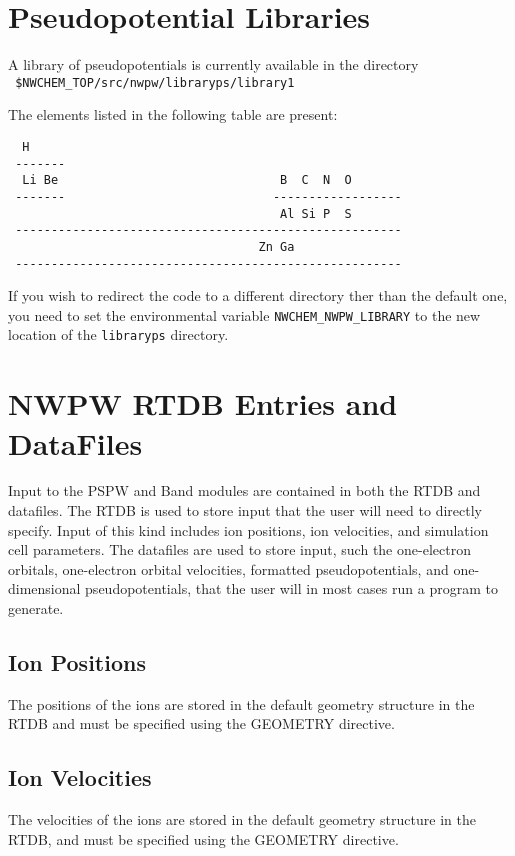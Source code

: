 \section{Pseudopotential Libraries}
\label{sec:psp_library}

A library of pseudopotentials is currently available  in the
directory \\
\verb+ $NWCHEM_TOP/src/nwpw/libraryps/library1+

The elements listed in the following table are present:

\begin{verbatim}
  H
 -------
  Li Be                               B  C  N  O
 -------                             ------------------
                                      Al Si P  S     
 ------------------------------------------------------
                                   Zn Ga               
 ------------------------------------------------------
\end{verbatim}

If you wish to redirect the code to a different directory ther than
the default one, 
you need to set the environmental variable
{\tt NWCHEM\_NWPW\_LIBRARY}
to the new location of the \verb+libraryps+ directory.



\section{NWPW RTDB Entries and DataFiles}
\label{sec:pspw_data}
Input to the PSPW and Band modules are contained in both the RTDB and datafiles.
The RTDB is used to store input that the user will need to directly specify.
Input of this kind includes ion positions, ion velocities, and simulation cell
parameters.  The datafiles are used to store input, such the one-electron 
orbitals, one-electron orbital velocities, formatted pseudopotentials, 
and one-dimensional pseudopotentials, that the user will in most cases
run a program to generate.

\subsection{Ion Positions}
The positions of the ions are stored in the default geometry structure
in the RTDB and must be specified  using the GEOMETRY directive.

\subsection{Ion Velocities}
The velocities of the ions are stored in the default geometry structure
in the RTDB, and must be specified using the GEOMETRY directive.


